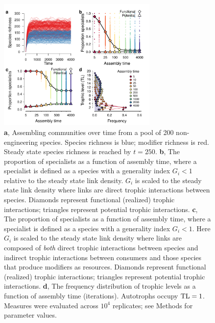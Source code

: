 \documentclass[twocolumn,preprintnumbers,amsmath,amssymb,superscriptaddress,linenumbers]{revtex4-1}
\begin{document}
\begin{figure}[h!]
\centering
\includegraphics[width=0.7\textwidth]{fig_trophic3_eng.pdf}
\caption{
\textbf{a}, Assembling communities over time from a pool of 200 non-engineering species. Species richness is blue; modifier richness is red.
Steady state species richness is reached by $t=250$.
\textbf{b}, The proportion of specialists as a function of assembly time, where a specialist is defined as a species with a generality index $G_i < 1$ relative to the steady state link density.
$G_i$ is scaled to the steady state link density where links are direct trophic interactions between species.
Diamonds represent functional (realized) trophic interactions; triangles represent potential trophic interactions.
\textbf{c}, The proportion of specialists as a function of assembly time, where a specialist is defined as a species with a generality index $G_i < 1$.
Here $G_i$ is scaled to the steady state link density where links are composed of \emph{both} direct trophic interactions between species and indirect trophic interactions between consumers and those species that produce modifiers as resources.
Diamonds represent functional (realized) trophic interactions; triangles represent potential trophic interactions.
\textbf{d}, The frequency distribution of trophic levels as a function of assembly time (iterations). 
Autotrophs occupy ${\rm TL}=1$.
Measures were evaluated across $10^4$ replicates; see Methods for parameter values.
}
\label{fig:trophiceng}
\end{figure}
\end{document}
